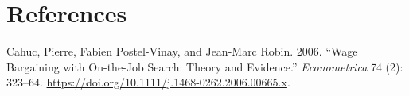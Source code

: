 \documentclass[
  letterpaper,
  DIV=11,
  numbers=noendperiod]{scrartcl}
\newlength{\cslhangindent}
\newlength{\cslentryspacingunit} %
\newenvironment{CSLReferences}[2] %
 {%
  \setlength{\parindent}{0pt}
  \ifodd #1
  \let\oldpar\par
  \def\par{\hangindent=\cslhangindent\oldpar}
  \fi
  \setlength{\parskip}{#2\cslentryspacingunit}
 }%
 {}
\begin{document}
\hypertarget{bibliography}{%
\section*{References}\label{bibliography}}

\hypertarget{refs}{}
\begin{CSLReferences}{1}{0}
\leavevmode{}%
Cahuc, Pierre, Fabien Postel-Vinay, and Jean-Marc Robin. 2006. {``Wage
{Bargaining} with {On-the-Job Search}: {Theory} and {Evidence}.''}
\emph{Econometrica} 74 (2): 323--64.
\url{https://doi.org/10.1111/j.1468-0262.2006.00665.x}.

\end{CSLReferences}
\end{document}
